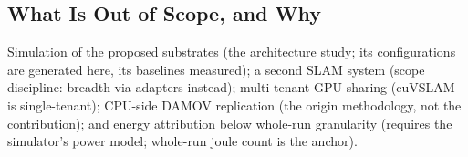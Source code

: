 \subsection{What Is Out of Scope, and Why}

Simulation of the proposed substrates (the architecture study; its configurations are generated here, its baselines measured); a second SLAM system (scope discipline: breadth via adapters instead); multi-tenant GPU sharing (cuVSLAM is single-tenant); CPU-side DAMOV replication (the origin methodology, not the contribution); and energy attribution below whole-run granularity (requires the simulator's power model; whole-run joule count is the anchor).
